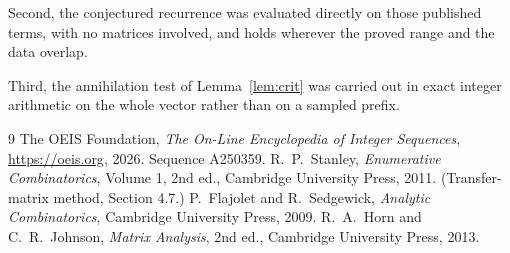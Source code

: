 \documentclass[11pt,a4paper]{article}
\theoremstyle{plain}
\theoremstyle{definition}
\begin{document}
Second, the conjectured recurrence was evaluated directly on those published terms, with no
matrices involved, and holds wherever the proved range and the data overlap.

Third, the annihilation test of Lemma~\ref{lem:crit} was carried out in exact integer
arithmetic on the whole vector rather than on a sampled prefix.

\begin{thebibliography}{9}
 The OEIS Foundation, \emph{The On-Line Encyclopedia of Integer
Sequences}, \url{https://oeis.org}, 2026. Sequence A250359.
 R.~P.~Stanley, \emph{Enumerative Combinatorics}, Volume 1, 2nd ed.,
Cambridge University Press, 2011. (Transfer-matrix method, Section 4.7.)
 P.~Flajolet and R.~Sedgewick, \emph{Analytic Combinatorics}, Cambridge
University Press, 2009.
 R.~A.~Horn and C.~R.~Johnson, \emph{Matrix Analysis}, 2nd ed., Cambridge
University Press, 2013.
\end{thebibliography}
\end{document}
